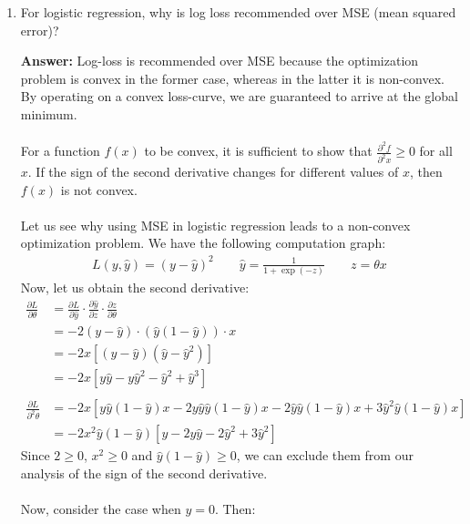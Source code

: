 \documentclass{article}
\newenvironment{QandA}{\begin{enumerate}[label=\arabic*.]}{\end{enumerate}}
\newenvironment{answer}{\par\normalfont \textbf{Answer:}}{}
\begin{document}
\begin{QandA}
    \item For logistic regression, why is log loss recommended over MSE (mean squared error)?
    \begin{answer}
        Log-loss is recommended over MSE because the optimization problem is convex in the former case, whereas in the latter it is non-convex. By operating on a convex loss-curve, we are guaranteed to arrive at the global minimum. \\\\
        For a function $f(x)$ to be convex, it is sufficient to show that $\frac{\partial^2 f}{\partial^2 x} \ge 0$ for all $x$. If the sign of the second derivative changes for different values of $x$, then $f(x)$ is not convex.\\\\
        Let us see why using MSE in logistic regression leads to a non-convex optimization problem. We have the following computation graph:
        \begin{align*}
            L(y, \hat{y}) = (y - \hat{y})^2 \quad\quad \hat{y} = \frac{1}{1 + \exp(-z)} \quad\quad z = \theta x
        \end{align*}
        Now, let us obtain the second derivative:
        \begin{align*}
            \frac{\partial L}{\partial \theta} &= \frac{\partial L}{\partial \hat{y}} \cdot \frac{\partial \hat{y}}{\partial z} \cdot \frac{\partial z}{\partial \theta} \\
            &= -2(y - \hat{y}) \cdot (\hat{y}(1 - \hat{y})) \cdot x \\
            &= -2x \left[ (y - \hat{y})(\hat{y} - \hat{y}^2) \right] \\
            &= -2x \left[ y\hat{y} - y\hat{y}^2 - \hat{y}^2 + \hat{y}^3 \right] \\\\
            \frac{\partial L}{\partial^2 \theta} &= -2x \left[ y\hat{y}(1-\hat{y})x - 2 y \hat{y} \hat{y} (1-\hat{y})x - 2 \hat{y}\hat{y}(1-\hat{y})x + 3\hat{y}^2\hat{y}(1-\hat{y})x \right] \\
            &= -2x^2\hat{y}(1-\hat{y}) \left[ y - 2y\hat{y} - 2\hat{y}^2 +3\hat{y}^2 \right]
        \end{align*}
        Since $2 \ge 0$, $x^2 \ge 0$ and $\hat{y}(1-\hat{y}) \ge 0$, we can exclude them from our analysis of the sign of the second derivative.\\\\
        Now, consider the case when $y=0$. Then:
        \begin{align*}

\end{align*}
\end{answer}
\end{QandA}
\end{document}
